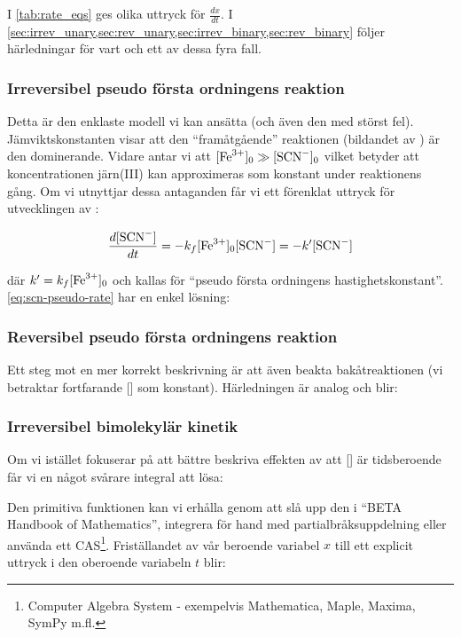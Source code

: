 I \cref{tab:rate_eqs} ges olika uttryck för $\frac{dx}{dt}$. I
\cref{sec:irrev_unary,sec:rev_unary,sec:irrev_binary,sec:rev_binary} 
följer härledningar för vart och ett av dessa fyra fall. 


\subsubsection{Irreversibel pseudo första ordningens reaktion}
\label{sec:irrev_unary}
Detta är den enklaste modell vi kan ansätta (och även den med störst fel).
Jämviktskonstanten visar att den ``framåtgående'' reaktionen (bildandet av )
är den dominerande. Vidare antar vi att $[\ce{Fe^3+}]_0 \gg [\ce{SCN-}]_0$ vilket
betyder att koncentrationen järn(III) kan approximeras som konstant under
reaktionens gång. Om vi utnyttjar dessa antaganden får vi ett förenklat
uttryck för utvecklingen av :

\begin{equation}
  \label{eq:scn-pseudo-rate}
  \frac{d[\ce{SCN-}]}{dt} = -k_f[\ce{Fe^3+}]_0[\ce{SCN-}] = -k'[\ce{SCN-}]
\end{equation}

där $k' = k_f[\ce{Fe^3+}]_0$ och kallas för ``pseudo första ordningens
hastighetskonstant''. \cref{eq:scn-pseudo-rate} har en enkel lösning: 



\subsubsection{Reversibel pseudo första ordningens reaktion}
\label{sec:rev_unary}
Ett steg mot en mer korrekt beskrivning är att även beakta
bakåtreaktionen (vi betraktar fortfarande [] som
konstant). Härledningen är analog och blir:




\subsubsection{Irreversibel bimolekylär kinetik}
\label{sec:irrev_binary}
Om vi istället fokuserar på att bättre beskriva effekten av att
[] är tidsberoende får vi en något svårare integral att lösa:



Den primitiva funktionen kan vi erhålla genom att slå upp den i ``BETA Handbook of
Mathematics'', integrera för hand med partialbråksuppdelning eller
använda ett CAS\footnote{  Computer Algebra System -   exempelvis
  Mathematica, Maple, Maxima, SymPy m.fl.}. Friställandet av vår beroende
variabel $x$ till ett explicit uttryck i den oberoende variabeln $t$
blir:

